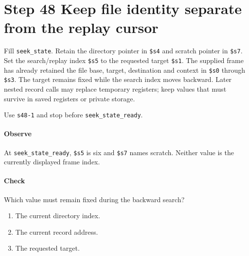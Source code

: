 \section{Step 48 Keep file identity separate from the replay cursor}
Fill \texttt{seek\_state}. Retain the directory pointer in \texttt{\$s4} and scratch pointer in \texttt{\$s7}. Set the search/replay index \texttt{\$s5} to the requested target \texttt{\$s1}. The supplied frame has already retained the file base, target, destination and context in \texttt{\$s0} through \texttt{\$s3}. The target remains fixed while the search index moves backward. Later nested record calls may replace temporary registers; keep values that must survive in saved registers or private storage.

Use \texttt{s48-1} and stop before \texttt{seek\_state\_ready}.

\paragraph{Observe} At \texttt{seek\_state\_ready}, \texttt{\$s5} is six and \texttt{\$s7} names scratch. Neither value is the currently displayed frame index.

\paragraph{Check} Which value must remain fixed during the backward search?
\begin{enumerate}[label=\Alph*.]
  \item The current directory index.
  \item The current record address.
  \item The requested target.
\end{enumerate}
